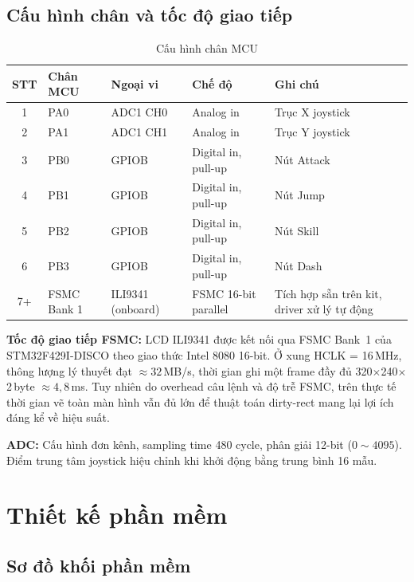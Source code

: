\documentclass[a4paper,12pt]{report}
\begin{document}
\subsection{Cấu hình chân và tốc độ giao tiếp}

\begin{table}[H]
\centering
\caption{Cấu hình chân MCU}
\label{tab:pins}
\begin{tabular}{c p{2.2cm} p{2.5cm} p{3cm} p{4cm}}
\toprule
\textbf{STT} & \textbf{Chân MCU} & \textbf{Ngoại vi} & \textbf{Chế độ} & \textbf{Ghi chú} \\
\midrule
1 & PA0 & ADC1 CH0 & Analog in & Trục X joystick \\
2 & PA1 & ADC1 CH1 & Analog in & Trục Y joystick \\
3 & PB0 & GPIOB & Digital in, pull-up & Nút Attack \\
4 & PB1 & GPIOB & Digital in, pull-up & Nút Jump \\
5 & PB2 & GPIOB & Digital in, pull-up & Nút Skill \\
6 & PB3 & GPIOB & Digital in, pull-up & Nút Dash \\
7+ & FSMC Bank 1 & ILI9341 (onboard) & FSMC 16-bit parallel & Tích hợp sẵn trên kit, driver xử lý tự động \\
\bottomrule
\end{tabular}
\end{table}

\noindent\textbf{Tốc độ giao tiếp FSMC:} LCD ILI9341 được kết nối qua FSMC Bank~1 của STM32F429I-DISCO theo giao thức Intel 8080 16-bit. Ở xung HCLK = 16\,MHz, thông lượng lý thuyết đạt $\approx 32$\,MB/s, thời gian ghi một frame đầy đủ 320$\times$240$\times$2\,byte $\approx 4{,}8$\,ms. Tuy nhiên do overhead câu lệnh và độ trễ FSMC, trên thực tế thời gian vẽ toàn màn hình vẫn đủ lớn để thuật toán dirty-rect mang lại lợi ích đáng kể về hiệu suất.

\noindent\textbf{ADC:} Cấu hình đơn kênh, sampling time 480 cycle, phân giải 12-bit ($0 \sim 4095$). Điểm trung tâm joystick hiệu chỉnh khi khởi động bằng trung bình 16 mẫu.

\section{Thiết kế phần mềm}

\subsection{Sơ đồ khối phần mềm}
\end{document}
